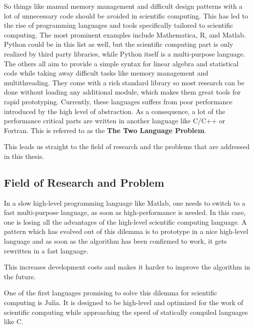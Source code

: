 So things like manual memory management and difficult design patterns with a lot of unnecessary code should be avoided in scientific computing.
This has led to the rise of programming languages and tools specifically tailored to scientific computing.
The most prominent examples include Mathematica, R, and Matlab. 
Python could be in this list as well, but the scientific computing part is only realized by third party libraries, while Python itself is a multi-purpose language.
The others all aim to provide a simple syntax for linear algebra and statistical code while taking away difficult tasks like memory management and multithreading. 
They come with a rich standard library so most research can be done without loading any additional module, which makes them great tools for rapid prototyping.
Currently, these languages suffers from poor performance introduced by the high level of abstraction.
As a consequence, a lot of the performance critical parts are written in another language like C/C++ or Fortran.
This is referred to as the \textbf{The Two Language Problem}\cite{ArrayMultiJeff}.

This leads us straight to the field of research and the problems that are addressed in this thesis.


\subsection{Field of Research and Problem}

In a slow high-level programming language like Matlab, one needs to switch to a fast multi-purpose language, as soon as high-performance is needed.
In this case, one is losing all the advantages of the high-level scientific computing language.
A pattern which has evolved out of this dilemma is to prototype in a nice high-level language and as soon as the algorithm has been confirmed to work, it gets rewritten in a fast language.

This increases development costs and makes it harder to improve the algorithm in the future.

One of the first languages promising to solve this dilemma for scientific computing is Julia\cite{DBLP:journals/corr/BezansonEKS14}. 
It is designed to be high-level and optimized for the work of scientific computing while approaching the speed of statically compiled languages like C.

